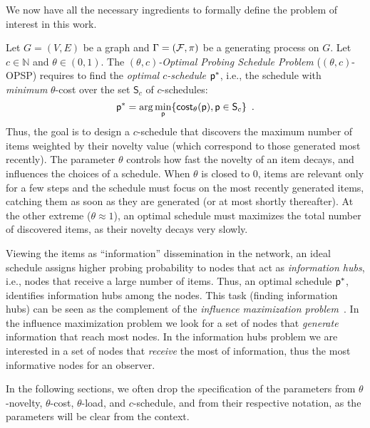 We now have all the necessary ingredients to formally define the problem of
interest in this work.

 Let $G=(V,E)$ be a graph and $\Gamma=(\mathcal{F},\pi)$ be a
generating process on $G$. Let $c\in\mathbb{N}$ and
$\theta\in(0,1)$. The \emph{$(\theta,c)$-Optimal Probing Schedule Problem}
($(\theta,c)$-OPSP) requires to find the \emph{optimal $c$-schedule} $\mathsf{p}^*$,
i.e., the schedule with \emph{minimum} $\theta$-cost over the set $\mathsf{S}_c$
of $c$-schedules:
\[
	\mathsf{p}^*=\arg\min_{\mathsf{p}} \{\mathsf{cost}_\theta(\mathsf{p}), \mathsf{p}\in\mathsf{S}_c\}\enspace.
\]
Thus, the goal is to design a $c$-schedule that discovers the maximum number of items weighted by their
novelty value (which correspond to those generated most recently).
The parameter $\theta$ controls how fast the novelty of an item decays, and influences the choices of a schedule.
When $\theta$ is closed to $0$, items are relevant only for a few steps and the schedule
must focus on the most recently generated items, catching them as soon as they are generated (or at most shortly
thereafter). At the other extreme ($\theta\approx 1$), an optimal schedule
must maximizes the total number of discovered items, as their novelty decays very
slowly.

Viewing the items as ``information'' dissemination in the network,
an ideal schedule assigns higher probing probability  to nodes
that act as \emph{ information hubs}, i.e., nodes that receive a large number of
items. Thus, an optimal schedule $\mathsf{p}^*$, identifies
information hubs among the nodes. This task (finding information hubs) can be
seen as the complement of the \emph{influence maximization
problem}~\citep{Kempe2003,Kempe2005}. In the influence maximization problem we
look for a set of nodes that \emph{generate} information that reach most nodes.
In the information hubs problem we are interested in a set of nodes that
\emph{receive} the most of information, thus the most informative nodes for an
observer.

In the following sections, we often drop the specification of the parameters
from $\theta$-novelty, $\theta$-cost, $\theta$-load, and $c$-schedule, and
from their respective notation, as the parameters will be clear from the
context.

